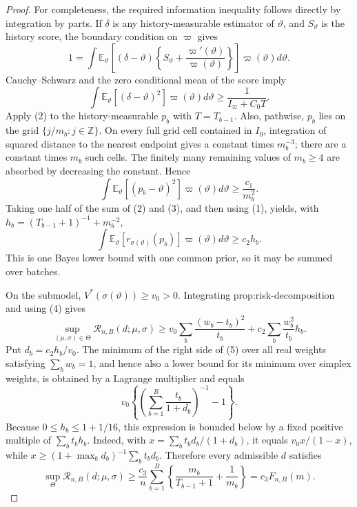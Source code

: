 \documentclass{article}
\begin{document}
\begin{proof}
For completeness, the required information inequality follows directly by integration by parts.  If \(\delta\) is any history-measurable estimator of \(\vartheta\), and \(S_\vartheta\) is the history score, the boundary condition on \(\varpi\) gives
\[
1=\int \mathbb E_\vartheta\!\left[(\delta-\vartheta)
 \left\{S_\vartheta+\frac{\varpi'(\vartheta)}{\varpi(\vartheta)}\right\}\right]
 \varpi(\vartheta)d\vartheta.
\]
Cauchy--Schwarz and the zero conditional mean of the score imply
\[
\int\mathbb E_\vartheta[(\delta-\vartheta)^2]\varpi(\vartheta)d\vartheta
\geq\frac1{I_\varpi+C_0T}.                                  \tag{2}
\]
Apply (2) to the history-measurable \(p_b\) with \(T=T_{b-1}\).  Also, pathwise, \(p_b\) lies on the grid \(\{j/m_b:j\in\mathbb Z\}\).  On every full grid cell contained in \(I_0\), integration of squared distance to the nearest endpoint gives a constant times \(m_b^{-3}\); there are a constant times \(m_b\) such cells.  The finitely many remaining values of \(m_b\geq4\) are absorbed by decreasing the constant.  Hence
\[
\int\mathbb E_\vartheta[(p_b-\vartheta)^2]\varpi(\vartheta)d\vartheta
\geq \frac{c_1}{m_b^2}.                                     \tag{3}
\]
Taking one half of the sum of (2) and (3), and then using (1), yields, with
\(h_b=(T_{b-1}+1)^{-1}+m_b^{-2}\),
\[
\int\mathbb E_\vartheta[r_{\sigma(\vartheta)}(p_b)]
 \varpi(\vartheta)d\vartheta\geq c_2h_b.                   \tag{4}
\]
This is one Bayes lower bound with one common prior, so it may be summed over batches.

On the submodel, \(V^*(\sigma(\vartheta))\geq v_0>0\).  Integrating prop:risk-decomposition and using (4) gives
\[
\sup_{(\mu,\sigma)\in\Theta}\mathcal R_{n,B}(d;\mu,\sigma)
\geq v_0\sum_b\frac{(w_b-t_b)^2}{t_b}
 +c_2\sum_b\frac{w_b^2}{t_b}h_b.                            \tag{5}
\]
Put \(d_b=c_2h_b/v_0\).  The minimum of the right side of (5) over all real weights satisfying \(\sum_bw_b=1\), and hence also a lower bound for its minimum over simplex weights, is obtained by a Lagrange multiplier and equals
\[
v_0\left\{\left(\sum_{b=1}^B\frac{t_b}{1+d_b}\right)^{-1}-1\right\}.
\]
Because \(0\leq h_b\leq1+1/16\), this expression is bounded below by a fixed positive multiple of \(\sum_bt_bh_b\).  Indeed, with
\(x=\sum_bt_bd_b/(1+d_b)\), it equals \(v_0x/(1-x)\), while
\(x\geq(1+\max_bd_b)^{-1}\sum_bt_bd_b\).  Therefore every admissible \(d\) satisfies
\[
\sup_{\Theta}\mathcal R_{n,B}(d;\mu,\sigma)
\geq \frac{c_3}{n}\sum_{b=1}^B
 \left\{\frac{m_b}{T_{b-1}+1}+\frac1{m_b}\right\}
=c_3F_{n,B}(m).                                              \tag{6}
\]


\end{proof}
\end{document}
